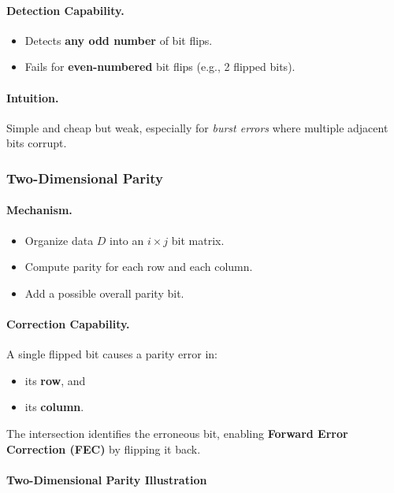 \documentclass[12pt]{article}
\begin{document}
\paragraph{Detection Capability.}
\begin{itemize}
    \item Detects \textbf{any odd number} of bit flips.
    \item Fails for \textbf{even-numbered} bit flips (e.g., 2 flipped bits).
\end{itemize}

\paragraph{Intuition.}
Simple and cheap but weak, especially for \emph{burst errors} where multiple adjacent bits corrupt.

\subsubsection{Two-Dimensional Parity}

\paragraph{Mechanism.}
\begin{itemize}
    \item Organize data $D$ into an $i \times j$ bit matrix.
    \item Compute parity for each row and each column.
    \item Add a possible overall parity bit.
\end{itemize}

\paragraph{Correction Capability.}
A single flipped bit causes a parity error in:
\begin{itemize}
    \item its \textbf{row}, and
    \item its \textbf{column}.
\end{itemize}

The intersection identifies the erroneous bit, enabling
\textbf{Forward Error Correction (FEC)} by flipping it back.

\paragraph{Two-Dimensional Parity Illustration}
\end{document}
